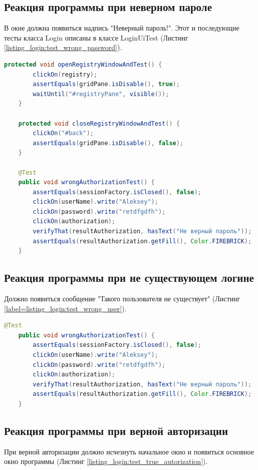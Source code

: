 \documentclass[a4paper,12pt]{article}
\begin{document}
\subsection{Реакция программы при неверном пароле}
В окне должна появиться надпись "Неверный пароль!". Этот и последующие тесты класса Login описаны в классе LoginUiTest (Листинг \ref{listing_login:test_wrong_password}).

\begin{lstlisting}[language=java, caption=Тестирование правильной авторизации, label=listing_login:test_true_autorization]
	protected void openRegistryWindowAndTest() {
        clickOn(registry);
        assertEquals(gridPane.isDisable(), true);
        waitUntil("#registryPane", visible());
    }

    protected void closeRegistryWindowAndTest() {
        clickOn("#back");
        assertEquals(gridPane.isDisable(), false);
    }    
    
    @Test
    public void wrongAuthorizationTest() {
        assertEquals(sessionFactory.isClosed(), false);
        clickOn(userName).write("Aleksey");
        clickOn(password).write("retdfgdfh");
        clickOn(authorization);
        verifyThat(resultAuthorization, hasText("Не верный пароль"));
        assertEquals(resultAuthorization.getFill(), Color.FIREBRICK);
    }
\end{lstlisting}

\subsection{Реакция программы при не существующем логине}
Должно появиться сообщение "Такого пользователя не существует" (Листинг \ref{label=listing_login:test_wrong_user}).
\begin{lstlisting}[language=java, caption=Тестирование ввода неверного пароля, label=listing_login:test_wrong_user]
    @Test
    public void wrongAuthorizationTest() {
        assertEquals(sessionFactory.isClosed(), false);
        clickOn(userName).write("Aleksey");
        clickOn(password).write("retdfgdfh");
        clickOn(authorization);
        verifyThat(resultAuthorization, hasText("Не верный пароль"));
        assertEquals(resultAuthorization.getFill(), Color.FIREBRICK);
    }
\end{lstlisting}


\subsection{Реакция программы при верной авторизации}
При верной авторизации должно исчезнуть начальное окно и появиться основное окно программы (Листинг \ref{listing_login:test_true_autorization}). 
\end{document}
